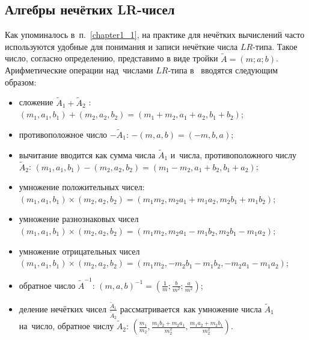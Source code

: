 \subsection{Алгебры нечётких LR-чисел}
Как упоминалось в~п.~\ref{chapter1_1}, на практике для нечётких вычислений часто используются удобные для понимания и записи нечёткие числа $LR$-типа. Такое число, согласно определению, представимо в виде тройки $\tilde{A}=\left( m;a;b \right)$. Арифметические операции над~числами $LR$-типа в~\cite{Pospelov, Yakhyaeva, Borisov_Alexeev_Msk} вводятся следующим образом:
\begin{itemize}
	\item сложение ${{\tilde{A}}_{1}}+{{\tilde{A}}_{2}}$ : $\left( {{m}_{1}},{{a}_{1}},{{b}_{1}} \right)+\left( {{m}_{2}},{{a}_{2}},{{b}_{2}} \right)=\left( {{m}_{1}}+{{m}_{2}},{{a}_{1}}+{{a}_{2}},{{b}_{1}}+{{b}_{2}} \right)$;
	\item противоположное число $-{{\tilde{A}}_{1}}$: $-\left( m,a,b \right)=\left( -m,b,a \right)$;
	\item вычитание вводится как сумма числа ${{\tilde{A}}_{1}}$ и~числа, противоположного числу ${{\tilde{A}}_{2}}$: $\left( {{m}_{1}},{{a}_{1}},{{b}_{1}} \right)-\left( {{m}_{2}},{{a}_{2}},{{b}_{2}} \right)=\left( {{m}_{1}}-{{m}_{2}},{{a}_{1}}+{{b}_{2}},{{b}_{1}}+{{a}_{2}} \right)$;
	\item умножение положительных чисел: $\left( {{m}_{1}},{{a}_{1}},{{b}_{1}} \right)\times \left( {{m}_{2}},{{a}_{2}},{{b}_{2}} \right)=\left( {{m}_{1}}{{m}_{2}},{{m}_{2}}{{a}_{1}}+{{m}_{1}}{{a}_{2}},{{m}_{2}}{{b}_{1}}+{{m}_{1}}{{b}_{2}} \right)$;
	\item умножение разнознаковых чисел $\left( {{m}_{1}},{{a}_{1}},{{b}_{1}} \right)\times \left( {{m}_{2}},{{a}_{2}},{{b}_{2}} \right)=\left( {{m}_{1}}{{m}_{2}},{{m}_{2}}{{a}_{1}}-{{m}_{1}}{{b}_{2}},{{m}_{2}}{{b}_{1}}-{{m}_{1}}{{a}_{2}} \right)$;
	\item умножение отрицательных чисел $\left( {{m}_{1}},{{a}_{1}},{{b}_{1}} \right)\times \left( {{m}_{2}},{{a}_{2}},{{b}_{2}} \right)=\left( {{m}_{1}}{{m}_{2}},-{{m}_{2}}{{b}_{1}}-{{m}_{1}}{{b}_{2}},-{{m}_{2}}{{a}_{1}}-{{m}_{1}}{{a}_{2}} \right)$;
	\item обратное число $\displaystyle {\tilde A}^{-1}$: $\displaystyle {{\left( m,a,b \right)}^{-1}}=\left( \frac{1}{m};\frac{b}{{{m}^{2}}};\frac{a}{{{m}^{2}}} \right)$;
	\item деление нечётких чисел $\displaystyle \frac{{{{\tilde{A}}}_{1}}}{{{{\tilde{A}}}_{2}}}$ рассматривается~как умножение числа ${{\tilde{A}}_{1}}$ на~число, обратное числу ${{\tilde{A}}_{2}}$: $\displaystyle \left( \frac{{{m}_{1}}}{{{m}_{2}}},\frac{{{m}_{1}}{{b}_{2}}+{{m}_{2}}{{a}_{1}}}{m_{2}^{2}},\frac{{{m}_{1}}{{a}_{2}}+{{m}_{2}}{{b}_{1}}}{m_{2}^{2}} \right)$.
\end{itemize}

